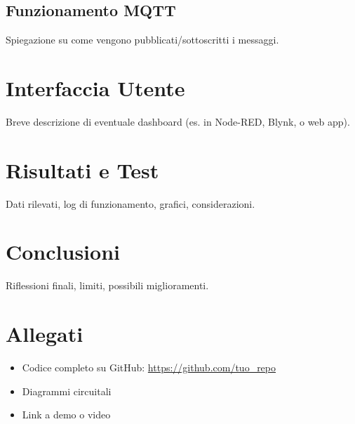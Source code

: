 \documentclass[12pt,a4paper]{article}
\begin{document}
	\subsection{Funzionamento MQTT}
	Spiegazione su come vengono pubblicati/sottoscritti i messaggi.
	
	\section{Interfaccia Utente}
	Breve descrizione di eventuale dashboard (es. in Node-RED, Blynk, o web app).
	
	\section{Risultati e Test}
	Dati rilevati, log di funzionamento, grafici, considerazioni.
	
	\section{Conclusioni}
	Riflessioni finali, limiti, possibili miglioramenti.
	
	\section*{Allegati}
	\begin{itemize}
		\item Codice completo su GitHub: \url{https://github.com/tuo_repo}
		\item Diagrammi circuitali
		\item Link a demo o video
	\end{itemize}
	
\end{document}

